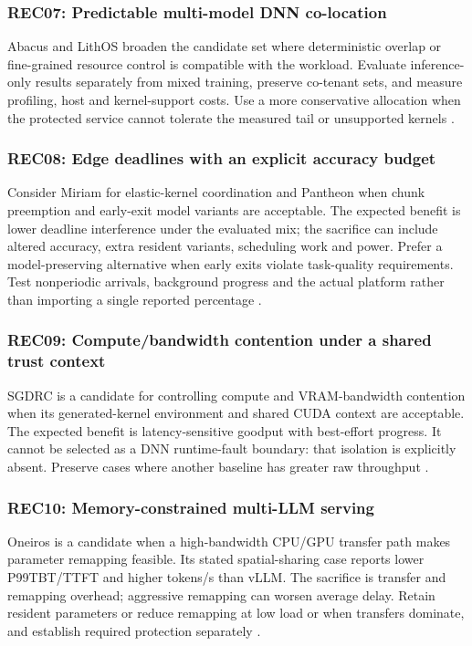 \subsubsection*{REC07: Predictable multi-model DNN co-location}
Abacus and LithOS broaden the candidate set where deterministic overlap or fine-grained resource control is compatible with the workload. Evaluate inference-only results separately from mixed training, preserve co-tenant sets, and measure profiling, host and kernel-support costs. Use a more conservative allocation when the protected service cannot tolerate the measured tail or unsupported kernels \cite{s021,s022}.

\subsubsection*{REC08: Edge deadlines with an explicit accuracy budget}
Consider Miriam for elastic-kernel coordination and Pantheon when chunk preemption and early-exit model variants are acceptable. The expected benefit is lower deadline interference under the evaluated mix; the sacrifice can include altered accuracy, extra resident variants, scheduling work and power. Prefer a model-preserving alternative when early exits violate task-quality requirements. Test nonperiodic arrivals, background progress and the actual platform rather than importing a single reported percentage \cite{s023,s025}.

\subsubsection*{REC09: Compute/bandwidth contention under a shared trust context}
SGDRC is a candidate for controlling compute and VRAM-bandwidth contention when its generated-kernel environment and shared CUDA context are acceptable. The expected benefit is latency-sensitive goodput with best-effort progress. It cannot be selected as a DNN runtime-fault boundary: that isolation is explicitly absent. Preserve cases where another baseline has greater raw throughput \cite{s024}.

\subsubsection*{REC10: Memory-constrained multi-LLM serving}
Oneiros is a candidate when a high-bandwidth CPU/GPU transfer path makes parameter remapping feasible. Its stated spatial-sharing case reports lower P99TBT/TTFT and higher tokens/s than vLLM. The sacrifice is transfer and remapping overhead; aggressive remapping can worsen average delay. Retain resident parameters or reduce remapping at low load or when transfers dominate, and establish required protection separately \cite{s026}.
